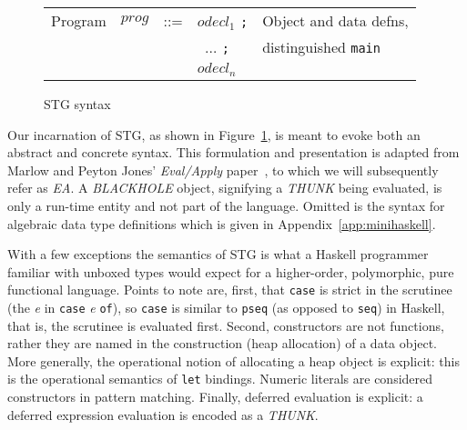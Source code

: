 \documentclass{llncs}
\begin{document}
\begin{figure}
\begin{tabular}{r r c l l}
Program      & $\mathit{prog}$ & ::= & $\mathit{odecl}_1$ \texttt{;}            & Object and data defns, \\
             &                 &     & \texttt{ } $\dots$ \texttt{;}                & distinguished \texttt{main}\\
             &                 &     & $\mathit{odecl}_n$ & 

\end{tabular}
\caption{STG syntax}
\label{fig:STGsyntax}
\end{figure}

Our incarnation of STG, as shown in Figure~\ref{fig:STGsyntax}, is meant to
evoke both an abstract and concrete syntax.  This formulation and presentation
is adapted from Marlow and Peyton Jones' \emph{Eval/Apply}
paper~\cite{Marlow:2004}, to which we will subsequently refer as \emph{EA}\@.
A \emph{BLACKHOLE} object, signifying a \emph{THUNK} being evaluated, is only
a run-time entity and not part of the language.  Omitted is the syntax for
algebraic data type definitions which is given in
Appendix~\ref{app:minihaskell}.

With a few exceptions the semantics of STG is what a Haskell programmer
familiar with unboxed types would expect for a higher-order, polymorphic, pure
functional language.  Points to note are, first, that \texttt{case} is strict
in the scrutinee (the \emph{e} in \texttt{case} \emph{e} \texttt{of}), so \texttt{case} is
similar to \texttt{pseq} (as opposed to \texttt{seq}) in Haskell, that is, the
scrutinee is evaluated first.  Second, constructors are not functions, rather
they are named in the construction (heap allocation) of a data object.  More
generally, the operational notion of allocating a heap object is explicit:
this is the operational semantics of \texttt{let} bindings.  Numeric literals
are considered constructors in pattern matching.
Finally, deferred evaluation is explicit:
a deferred expression evaluation is encoded as a \emph{THUNK}.
\end{document}

